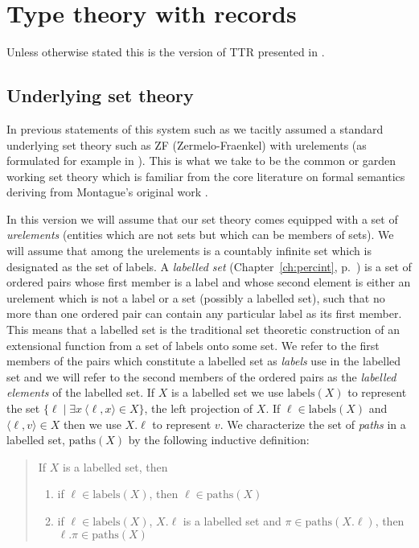 \chapter{Type theory with records}
\label{app:ttr}

Unless otherwise stated this is the version of TTR presented in 
\cite{Cooper2012}.

 \section{Underlying set theory}
 \label{app:sets}
In previous statements of this system such as \cite{Cooper2012} we
tacitly assumed a standard underlying set theory such as ZF
(Zermelo-Fraenkel) with urelements (as formulated for example in \citealp{Suppes1960}).  This is what we take to be the
common or garden working set theory which is familiar from the core
literature on formal semantics deriving from Montague's original work
\citep{Montague1974}.  

In this version we
will assume that our set theory comes equipped with a set of
\textit{urelements} (entities which are not sets but which can be
members of sets).  We will assume that among the urelements is a countably infinite
set which is designated as the set of labels.  A \textit{labelled set}
(Chapter~\ref{ch:percint}, p.~\pageref{sec:labelled-sets}) is a set
of ordered pairs whose first member is a label and whose second
element is either an urelement which is not a label or a set (possibly a labelled
set), such that no more than one ordered pair can contain any
particular label as its first member.  This means that a labelled set
is the traditional set theoretic construction of an extensional
function from a set of labels onto some set.  We refer to the first members of the pairs which constitute a
labelled set as \textit{labels} use in the labelled set and we will refer to
the second members of the ordered pairs as the \textit{labelled
  elements} of the labelled set.  If $X$ is a labelled set we use
$\mathrm{labels}(X)$ to represent the set $\{\ell\mid\exists 
x\ \langle\ell,x\rangle\in X\}$, the left projection of $X$.  If
$\ell\in\mathrm{labels}(X)$ and $\langle\ell,v\rangle\in X$ then we
use $X.\ell$ to represent $v$.  We characterize the set of
\textit{paths} in a labelled set, $\mathrm{paths}(X)$ by the following
inductive definition:
\begin{quote}
If $X$ is a labelled set, then
\begin{enumerate} 
 
\item if $\ell\in\mathrm{labels}(X)$, then $\ell\in\mathrm{paths}(X)$ 
 
\item if $\ell\in\mathrm{labels}(X)$, $X.\ell$ is a labelled set and
  $\pi\in\mathrm{paths}(X.\ell)$, then $\ell.\pi\in\mathrm{paths}(X)$ 
 
\end{enumerate} 
\end{quote}
  
